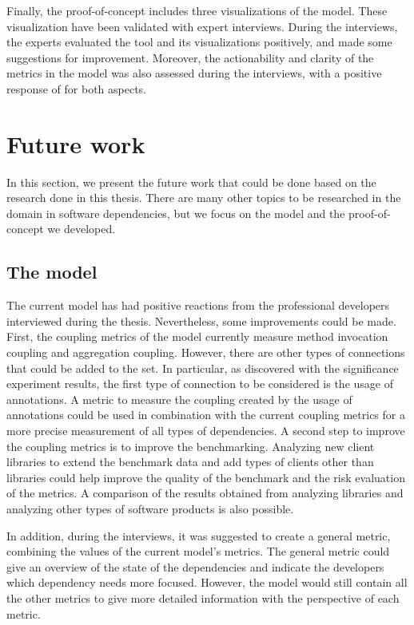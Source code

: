 Finally, the proof-of-concept includes three visualizations of the model. These visualization have been validated with expert interviews. During the interviews, the experts evaluated the tool and its visualizations positively, and made some suggestions for improvement. Moreover, the actionability and clarity of the metrics in the model was also assessed during the interviews, with a positive response of for both aspects.

\section{Future work} \label{sec:future_work}
In this section, we present the future work that could be done based on the research done in this thesis. There are many other topics to be researched in the domain in software dependencies, but we focus on the model and the proof-of-concept we developed.

\subsection{The model}

The current model has had positive reactions from the professional developers interviewed during the thesis. Nevertheless, some improvements could be made. First, the coupling metrics of the model currently measure method invocation coupling and aggregation coupling. However, there are other types of connections that could be added to the set. In particular, as discovered with the significance experiment results, the first type of connection to be considered is the usage of annotations. A metric to measure the coupling created by the usage of annotations could be used in combination with the current coupling metrics for a more precise measurement of all types of dependencies. A second step to improve the coupling metrics is to improve the benchmarking. Analyzing new client libraries to extend the benchmark data and add types of clients other than libraries could help improve the quality of the benchmark and the risk evaluation of the metrics. A comparison of the results obtained from analyzing libraries and analyzing other types of software products is also possible.

In addition, during the interviews, it was suggested to create a general metric, combining the values of the current model's metrics. The general metric could give an overview of the state of the dependencies and indicate the developers which dependency needs more focused. However, the model would still contain all the other metrics to give more detailed information with the perspective of each metric.

